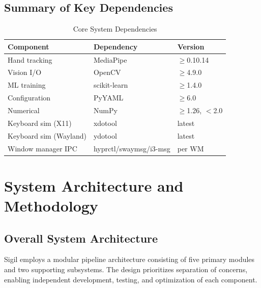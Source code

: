 \documentclass[11pt,a4paper]{article}
\begin{document}
\subsection{Summary of Key Dependencies}

\begin{table}[H]
\centering
\begin{tabular}{@{}lll@{}}
\toprule
\textbf{Component} & \textbf{Dependency} & \textbf{Version} \\
\midrule
Hand tracking & MediaPipe & $\geq$0.10.14 \\
Vision I/O & OpenCV & $\geq$4.9.0 \\
ML training & scikit-learn & $\geq$1.4.0 \\
Configuration & PyYAML & $\geq$6.0 \\
Numerical & NumPy & $\geq$1.26, $<$2.0 \\
Keyboard sim (X11) & xdotool & latest \\
Keyboard sim (Wayland) & ydotool & latest \\
Window manager IPC & hyprctl/swaymsg/i3-msg & per WM \\
\bottomrule
\end{tabular}
\caption{Core System Dependencies}
\end{table}

\section{System Architecture and Methodology}

\subsection{Overall System Architecture}

Sigil employs a modular pipeline architecture consisting of five primary modules and two supporting subsystems. The design prioritizes separation of concerns, enabling independent development, testing, and optimization of each component.
\end{document}
